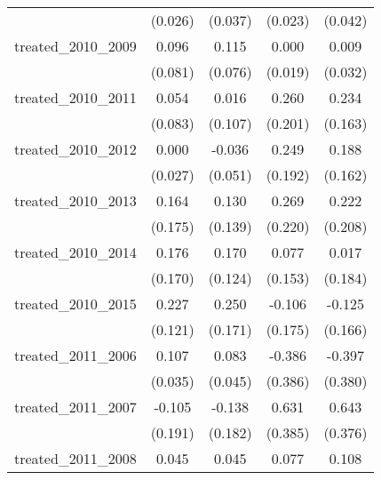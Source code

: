{\begin{tabular}{l*{4}{c}}
            &     (0.026)         &     (0.037)         &     (0.023)         &     (0.042)         \\
[1em]
treated\_2010\_2009&       0.096         &       0.115         &       0.000         &       0.009         \\
            &     (0.081)         &     (0.076)         &     (0.019)         &     (0.032)         \\
[1em]
treated\_2010\_2011&       0.054         &       0.016         &       0.260         &       0.234         \\
            &     (0.083)         &     (0.107)         &     (0.201)         &     (0.163)         \\
[1em]
treated\_2010\_2012&       0.000         &      -0.036         &       0.249         &       0.188         \\
            &     (0.027)         &     (0.051)         &     (0.192)         &     (0.162)         \\
[1em]
treated\_2010\_2013&       0.164         &       0.130         &       0.269         &       0.222         \\
            &     (0.175)         &     (0.139)         &     (0.220)         &     (0.208)         \\
[1em]
treated\_2010\_2014&       0.176         &       0.170         &       0.077         &       0.017         \\
            &     (0.170)         &     (0.124)         &     (0.153)         &     (0.184)         \\
[1em]
treated\_2010\_2015&       0.227         &       0.250         &      -0.106         &      -0.125         \\
            &     (0.121)         &     (0.171)         &     (0.175)         &     (0.166)         \\
[1em]
treated\_2011\_2006&       0.107\sym{**} &       0.083         &      -0.386         &      -0.397         \\
            &     (0.035)         &     (0.045)         &     (0.386)         &     (0.380)         \\
[1em]
treated\_2011\_2007&      -0.105         &      -0.138         &       0.631         &       0.643         \\
            &     (0.191)         &     (0.182)         &     (0.385)         &     (0.376)         \\
[1em]
treated\_2011\_2008&       0.045         &       0.045         &       0.077         &       0.108\sym{*}  \\

\end{tabular}}
